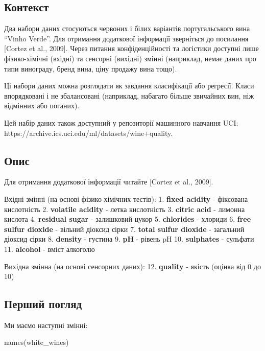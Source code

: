 \documentclass[
  letterpaper,
  DIV=11,
  numbers=noendperiod]{scrreprt}
\newenvironment{Shaded}{\begin{snugshade}}{\end{snugshade}}
\newcommand{\FunctionTok}[1]{\textcolor[rgb]{0.28,0.35,0.67}{#1}}
\newcommand{\NormalTok}[1]{\textcolor[rgb]{0.00,0.23,0.31}{#1}}
\begin{document}
\subsection{Контекст}\label{ux43aux43eux43dux442ux435ux43aux441ux442}

Два набори даних стосуються червоних і білих варіантів португальського
вина ``Vinho Verde''. Для отримання додаткової інформації зверніться до
посилання {[}Cortez et al., 2009{]}. Через питання конфіденційності та
логістики доступні лише фізико-хімічні (вхідні) та сенсорні (вихідні)
змінні (наприклад, немає даних про типи винограду, бренд вина, ціну
продажу вина тощо).

Ці набори даних можна розглядати як завдання класифікації або регресії.
Класи впорядковані і не збалансовані (наприклад, набагато більше
звичайних вин, ніж відмінних або поганих).

Цей набір даних також доступний у репозиторії машинного навчання UCI:
https://archive.ics.uci.edu/ml/datasets/wine+quality.

\subsection{Опис}\label{ux43eux43fux438ux441}

Для отримання додаткової інформації читайте {[}Cortez et al., 2009{]}.

Вхідні змінні (на основі фізико-хімічних тестів): 1. \textbf{fixed
acidity} - фіксована кислотність 2. \textbf{volatile acidity} - летка
кислотність 3. \textbf{citric acid} - лимонна кислота 4.
\textbf{residual sugar} - залишковий цукор 5. \textbf{chlorides} -
хлориди 6. \textbf{free sulfur dioxide} - вільний діоксид сірки 7.
\textbf{total sulfur dioxide} - загальний діоксид сірки 8.
\textbf{density} - густина 9. \textbf{pH} - рівень pH 10.
\textbf{sulphates} - сульфати 11. \textbf{alcohol} - вміст алкоголю

Вихідна змінна (на основі сенсорних даних): 12. \textbf{quality} -
якість (оцінка від 0 до 10)

\subsection{Перший
погляд}\label{ux43fux435ux440ux448ux438ux439-ux43fux43eux433ux43bux44fux434}

Ми маємо наступні змінні:

\begin{Shaded}
\begin{Highlighting}[]
\FunctionTok{names}\NormalTok{(white\_wines)}
\end{Highlighting}
\end{Shaded}
\end{document}
